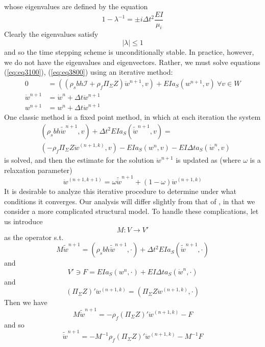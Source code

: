 \documentclass{article}
\begin{document}
whose eigenvalues are defined by the equation
\[ 1-\lambda^{-1} = \pm i \Delta t^2 \frac{EI}{\mu_i} \]
Clearly the eigenvalues satisfy
\[ | \lambda | \leq 1 \]
and so the time stepping scheme is unconditionally stable.
In practice, however, we do not have the eigenvalues and eigenvectors.  
Rather, we must solve equations (\ref{eq:eq3100}), (\ref{eq:eq3800}) using an iterative method:
\begin{equation}
\begin{aligned}
0 &= ((\rho_sbh\mathcal{I}+\rho_f \Pi_{\Sigma}Z)\ddot{w}^{n+1}, v) + EI a_S(w^{n+1},v) \ \forall v \in W \\
\dot{w}^{n+1} &= \dot{w}^n+\Delta t\ddot{w}^{n+1} \\
w^{n+1} &= w^n+\Delta t\dot{w}^{n+1} 
\end{aligned}
\label{eq:eq3850}
\end{equation}
One classic method is a fixed point method, in which at each iteration the system 
\begin{equation} \begin{aligned}
&(\rho_sbh\tilde{\ddot{w}}^{n+1}, v) + \Delta t^2 EI a_S(\tilde{\ddot{w}}^{n+1},v)= \\
&(-\rho_f \Pi_{\Sigma}Z\ddot{w}^{(n+1,k)},v)- EI a_S(w^n,v)-EI\Delta t a_S(\dot{w}^n,v)
\end{aligned}
\label{eq:eq3860}
\end{equation}
is solved, and then the estimate for the solution $\ddot{w}^{n+1}$ is updated as (where $\omega$ is a relaxation parameter)
\[ \ddot{w}^{(n+1,k+1)} = \omega\tilde{\ddot{w}}^{n+1} + (1-\omega)\ddot{w}^{(n+1,k)} \]
It is desirable to analyze this iterative procedure to determine under what conditions it converges. 
Our analysis will differ slightly from that of \cite{Causin2004}, in that we consider a more complicated structural model.
To handle these complications, let us introduce 
\[ M: V \to V' \]
as the operator s.t.
\[ M\tilde{\ddot{w}}^{n+1} = (\rho_sbh\tilde{\ddot{w}}^{n+1}, \cdot) + \Delta t^2 EI a_S(\tilde{\ddot{w}}^{n+1},\cdot) \]
and
\[ V' \ni F =  EI a_S(w^n,\cdot)+EI\Delta t a_S(\dot{w}^n,\cdot)\]
and 
\[ \left(\Pi_{\Sigma}Z\right)' \ddot{w}^{(n+1,k)} = (\Pi_{\Sigma}Z\ddot{w}^{(n+1,k)},\cdot) \]
Then we have
\[M\tilde{\ddot{w}}^{n+1} = -\rho_f  \left(\Pi_{\Sigma}Z\right)' \ddot{w}^{(n+1,k)} - F \]
and so
\begin{equation} \tilde{\ddot{w}}^{n+1} = -M^{-1}\rho_f  \left(\Pi_{\Sigma}Z\right)' \ddot{w}^{(n+1,k)} - M^{-1} F \label{eq:eq3900} \end{equation}
\end{document}
